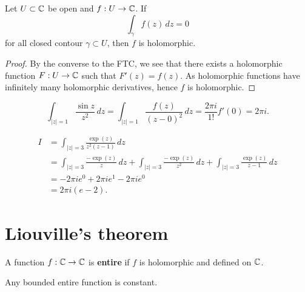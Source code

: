 
\begin{theorem}[Morera]
    Let $U \subset \mathbb{C}$ be open and $f: U \to \mathbb{C}$.
    If
    \[
        \int_\gamma f(z) \,dz = 0
    \]
    for all closed contour $\gamma \subset U$, then $f$ is holomorphic.
\end{theorem}

\begin{proof}
    By the converse to the FTC, 
    we see that there exists a holomorphic function
    $F: U \to \mathbb{C}$
    such that $F'(z) = f(z)$.
    As holomorphic functions have infinitely many holomorphic derivatives,
    hence $f$ is holomorphic.
\end{proof}

\begin{example}
    \[
        \int_{\lvert z \rvert = 1} \frac{\sin{z}}{z^2} \,dz
        = \int_{\lvert z \rvert = 1} \frac{f(z)}{(z - 0)^2} \,dz
        = \frac{2\pi i}{1!} f'(0)
        = 2\pi i.
    \]
\end{example}

\begin{example}
    \begin{align*}
        I
        &= \int_{\lvert z \rvert = 3} \frac{\exp(z)}{z^2(z-1)} \,dz \\
        &= \int_{\lvert z \rvert = 3} \frac{-\exp(z)}{z} \,dz
            + \int_{\lvert z \rvert = 3} \frac{-\exp(z)}{z^2} \,dz
            + \int_{\lvert z \rvert = 3} \frac{\exp(z)}{z-1} \,dz \\
        &= -2\pi i e^0 + 2\pi i e^1 - 2\pi ie^0 \\
        &= 2\pi i(e - 2).
    \end{align*}
\end{example}

\section{Liouville's theorem}

\begin{definition}[Entire]
    A function $f: \mathbb{C} \to \mathbb{C}$ is \textbf{entire} if
    $f$ is holomorphic and defined on $\mathbb{C}$.
\end{definition}

\begin{theorem}[Liouville]
    Any bounded entire function is constant.
\end{theorem}


